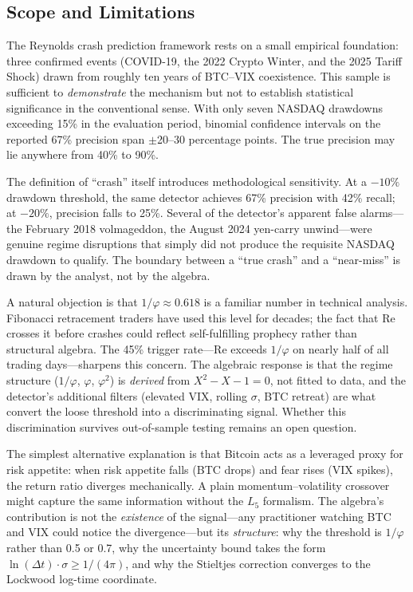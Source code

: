 \subsection{Scope and Limitations}

The Reynolds crash prediction framework rests on a small empirical foundation: three confirmed events (COVID-19, the 2022 Crypto Winter, and the 2025 Tariff Shock) drawn from roughly ten years of BTC--VIX coexistence. This sample is sufficient to \emph{demonstrate} the mechanism but not to establish statistical significance in the conventional sense. With only seven NASDAQ drawdowns exceeding 15\% in the evaluation period, binomial confidence intervals on the reported 67\% precision span $\pm$20--30 percentage points. The true precision may lie anywhere from 40\% to 90\%.

The definition of ``crash'' itself introduces methodological sensitivity. At a $-10\%$ drawdown threshold, the same detector achieves 67\% precision with 42\% recall; at $-20\%$, precision falls to 25\%. Several of the detector's apparent false alarms---the February 2018 volmageddon, the August 2024 yen-carry unwind---were genuine regime disruptions that simply did not produce the requisite NASDAQ drawdown to qualify. The boundary between a ``true crash'' and a ``near-miss'' is drawn by the analyst, not by the algebra.

A natural objection is that $1/\varphi \approx 0.618$ is a familiar number in technical analysis. Fibonacci retracement traders have used this level for decades; the fact that Re crosses it before crashes could reflect self-fulfilling prophecy rather than structural algebra. The 45\% trigger rate---Re exceeds $1/\varphi$ on nearly half of all trading days---sharpens this concern. The algebraic response is that the regime structure ($1/\varphi$, $\varphi$, $\varphi^2$) is \emph{derived} from $X^2 - X - 1 = 0$, not fitted to data, and the detector's additional filters (elevated VIX, rolling $\sigma$, BTC retreat) are what convert the loose threshold into a discriminating signal. Whether this discrimination survives out-of-sample testing remains an open question.

The simplest alternative explanation is that Bitcoin acts as a leveraged proxy for risk appetite: when risk appetite falls (BTC drops) and fear rises (VIX spikes), the return ratio diverges mechanically. A plain momentum--volatility crossover might capture the same information without the $L_5$ formalism. The algebra's contribution is not the \emph{existence} of the signal---any practitioner watching BTC and VIX could notice the divergence---but its \emph{structure}: why the threshold is $1/\varphi$ rather than 0.5 or 0.7, why the uncertainty bound takes the form $\ln(\Delta t) \cdot \sigma \geq 1/(4\pi)$, and why the Stieltjes correction converges to the Lockwood log-time coordinate.

